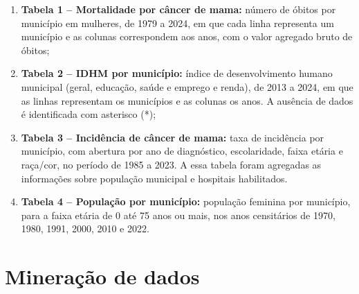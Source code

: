 \begin{enumerate}
    \item \textbf{Tabela 1 -- Mortalidade por câncer de mama:} número de óbitos por município em mulheres, de 1979 a 2024, em que cada linha representa um município e as colunas correspondem aos anos, com o valor agregado bruto de óbitos;
    \item \textbf{Tabela 2 -- IDHM por município:} índice de desenvolvimento humano municipal (geral, educação, saúde e emprego e renda), de 2013 a 2024, em que as linhas representam os municípios e as colunas os anos. A ausência de dados é identificada com asterisco (*);
    \item \textbf{Tabela 3 -- Incidência de câncer de mama:} taxa de incidência por município, com abertura por ano de diagnóstico, escolaridade, faixa etária e raça/cor, no período de 1985 a 2023. A essa tabela foram agregadas as informações sobre população municipal e hospitais habilitados.
    \item \textbf{Tabela 4 -- População por município:} população feminina por município, para a faixa etária de 0 até 75 anos ou mais, nos anos censitários de 1970, 1980, 1991, 2000, 2010 e 2022.
\end{enumerate}

\section{Mineração de dados}




